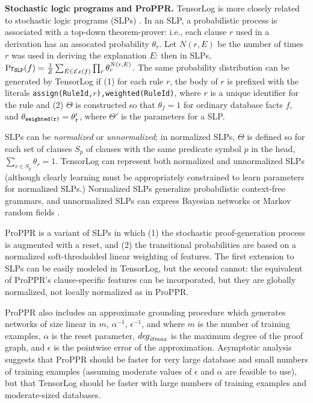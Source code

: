 \documentclass{article}
\newcommand{\cd}[1]{{\small \texttt{#1}}}
\newcommand{\mysubsection}[1]{\textbf{{#1}.}}
\newcommand{\trm}[1]{\textit{#1}}
\newcommand{\exs}{{\cal E}x}
\begin{document}
\mysubsection{Stochastic logic programs and ProPPR} \label{sec:SLPs}
TensorLog is more closely related to stochastic logic programs (SLPs)
\cite{DBLP:journals/ml/Cussens01}. In an SLP, a probabilistic process
is associated with a top-down theorem-prover: i.e., each clause $r$
used in a derivation has an assocated probability $\theta_{r}$.  Let
$N(r,E)$ be the number of times $r$ was used in deriving the
explanation $E$: then in SLPs,
\( \Pr_\cd{SLP}(f) = \frac{1}{Z} \sum_{E\in\exs(f)} \prod_r \theta_r^{N(r,E)}
\). 
The same probability distribution can be generated by TensorLog if (1)
for each rule $r$, the body of $r$ is prefixed with the literals
\cd{assign(RuleId,$r$),weighted(RuleId)}, where $r$ is a unique
identifier for the rule and (2) $\Theta$ is constructed so that
$\theta_f=1$ for ordinary database facts $f$, and
$\theta_\cd{weighted(r)}=\theta'_\cd{r}$, where $\Theta'$ is the
parameters for a SLP.

SLPs can be \trm{normalized} or \trm{unnormalized}; in normalized
SLPs, $\Theta$ is defined so for each set of clauses $S_p$ of clauses
with the same predicate symbol $p$ in the head, $\sum_{r\in{}S_p}
\theta_r=1$.  TensorLog can represent both normalized and unnormalized
SLPs (although clearly learning must be appropriately constrained to
learn parameters for normalized SLPs.)  Normalized SLPs generalize
probabilistic context-free grammars, and unnormalized SLPs can express
Bayesian networks or Markov random fields
\cite{DBLP:journals/ml/Cussens01}.

ProPPR \cite{wang2013programming} is a variant of SLPs in which (1)
the stochastic proof-generation process is augmented with a reset, and
(2) the transitional probabilities are based on a normalized
soft-thresholded linear weighting of features.  The first extension to
SLPs can be easily modeled in TensorLog, but the second cannot: the
equivalent of ProPPR's clause-specific features can be incorporated,
but they are globally normalized, not locally normalized as in ProPPR.

ProPPR also includes an approximate grounding procedure which
generates networks of size linear in $m$, $\alpha^{-1}$,
$\epsilon^{-1}$, and where $m$ is the number of training examples,
$\alpha$ is the reset parameter, $\it{deg}_{it max}$ is the maximum
degree of the proof graph, and $\epsilon$ is the pointwise error of
the approximation.  Asymptotic analysis suggests that ProPPR should be
faster for very large database and small numbers of training examples
(assuming moderate values of $\epsilon$ and $\alpha$ are feasible to
use), but that TensorLog should be faster with large numbers of
training examples and moderate-sized databases.
\end{document}
